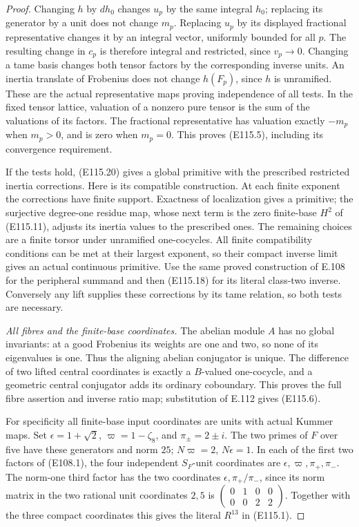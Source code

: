 \begin{proof}
Changing $h$ by $dh_0$ changes $u_p$ by the same integral
$h_0$; replacing its generator by a unit does not change
$m_p$.  Replacing $u_p$ by its displayed fractional
representative changes it by an integral vector, uniformly
bounded for all $p$.  The resulting change in $c_p$ is
therefore integral and restricted, since $v_p\to0$.
Changing a tame basis changes both tensor factors by the
corresponding inverse units.  An inertia translate of Frobenius
does not change $h(F_p)$, since $h$ is unramified.
These are the actual representative maps proving independence
of all tests.
In the fixed tensor lattice, valuation of a nonzero pure tensor
is the sum of the valuations of its factors.
The fractional representative has valuation exactly $-m_p$
when $m_p>0$, and is zero when $m_p=0$.
This proves (E115.5), including its convergence requirement.

If the tests hold, (E115.20) gives a global primitive with
the prescribed restricted inertia corrections.
Here is its compatible construction.  At each finite exponent
the corrections have finite support.  Exactness of localization
gives a primitive; the surjective degree-one residue map, whose
next term is the zero finite-base $H^2$ of (E115.11), adjusts
its inertia values to the prescribed ones.
The remaining choices are a finite torsor under unramified
one-cocycles.  All finite compatibility conditions can be met
at their largest exponent, so their compact inverse limit
gives an actual continuous primitive.
Use the same proved construction of E.108 for the peripheral
summand and then (E115.18) for its literal class-two inverse.
Conversely any lift supplies these corrections by its tame
relation, so both tests are necessary.

\emph{All fibres and the finite-base coordinates.}
The abelian module $A$ has no global invariants: at a good
Frobenius its weights are one and two, so none of its
eigenvalues is one.  Thus the aligning abelian conjugator
is unique.  The difference of two lifted central coordinates
is exactly a $B$-valued one-cocycle, and a geometric central
conjugator adds its ordinary coboundary.
This proves the full fibre assertion and inverse ratio map;
substitution of E.112 gives (E115.6).

For specificity all finite-base input coordinates are units
with actual Kummer maps.  Set $\epsilon=1+\sqrt2$,
$\varpi=1-\zeta_8$, and $\pi_\pm=2\pm i$.
The two primes of $F$ over five have these generators and
norm $25$; $N\varpi=2$, $N\epsilon=1$.
In each of the first two factors of (E108.1), the four
independent $S_F$-unit coordinates are
$\epsilon,\varpi,\pi_+,\pi_-$.
The norm-one third factor has the two coordinates
$\epsilon,\pi_+/\pi_-$, since its norm matrix in the
two rational unit coordinates $2,5$ is
$\left(\begin{smallmatrix}0&1&0&0\\0&0&2&2\end{smallmatrix}\right)$.
Together with the three compact coordinates this gives the
literal $R^{13}$ in (E115.1).


\end{proof}
